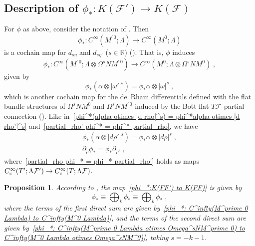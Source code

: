 \documentclass{memo-l}
\theoremstyle{plain}
\newtheorem{prop}[thm]{Proposition}
\theoremstyle{definition}
\theoremstyle{remark}
\newcommand{\R}{\mathbb{R}}
\newcommand{\FF}{\mathcal{F}}
\newcommand{\Cinftyc}{C^\infty_{\text{\rm c}}}
\numberwithin{section}{chapter}
\numberwithin{equation}{section}%
\begin{document}
\subsection{Description of $\phi_*:K(\FF')\to K(\FF)$}\label{ss: description of phi_*: K(FF') to K(FF)}

For $\phi$ as above, consider the notation of . Then
\begin{equation}\label{phi_*: C^infty(M^prime 0 Lambda) to C^infty(M^0 Lambda)}
\phi_*:C^\infty(M^{\prime\,0};\Lambda)\to C^\infty(M^0;\Lambda)
\end{equation}
is a cochain map for $d_{s\eta}$ and $d_{s\eta'}$ ($s\in\R$) (). That is, $\phi$ induces
\begin{equation}
\label{phi_*: C^infty(M^prime 0 Lambda otimes Omega^sNM^prime 0) to C^infty(M^0 Lambda otimes Omega^sNM^0)}
\phi_*:C^\infty(M^{\prime\,0};\Lambda\otimes\Omega^sNM^{\prime\,0})\to C^\infty(M^0;\Lambda\otimes\Omega^sNM^0)\;,
\end{equation} 
given by
\begin{equation}\label{phi_*(alpha otimes |omega'|^s) = phi_*alpha otimes |omega|^s}
\phi_*(\alpha\otimes|\omega'|^s)=\phi_*\alpha\otimes|\omega|^s\;,
\end{equation}
which is another cochain map for the de~Rham differentials defined with the flat bundle structures of $\Omega^sNM^0$ and $\Omega^sNM^{\prime\,0}$ induced by the Bott flat $T\FF$-partial connection (). Like in~\eqref{phi^*(alpha otimes |d rho|^s) = phi^*alpha otimes |d rho'|^s} and~\eqref{partial_rho' phi^* = phi^* partial_rho}, we have
\begin{gather}
\phi_*(\alpha\otimes|d\rho'|^s)=\phi_*\alpha\otimes|d\rho|^s\;,
\label{phi_*(alpha otimes |d rho'|^s) = phi_*alpha otimes |d rho|^s}\\
\partial_\rho\phi_*=\phi_*\partial_{\rho'}\;,
\label{partial_rho phi_* = phi_* partial_rho'}
\end{gather}
where~\eqref{partial_rho phi_* = phi_* partial_rho'} holds as maps $\Cinftyc(T';\Lambda\FF')\to\Cinftyc(T;\Lambda\FF)$.


\begin{prop}\label{p: phi_* equiv bigoplus_k phi_*}
According to , the map~\eqref{phi_*:K(FF') to K(FF)} is given by
\[
\phi_*\equiv\bigoplus_k\phi_*\equiv\bigoplus_k\phi_*\;,
\]
where the terms of the first direct sum are given by~\eqref{phi_*: C^infty(M^prime 0 Lambda) to C^infty(M^0 Lambda)}, and the terms of the second direct sum are given by~\eqref{phi_*: C^infty(M^prime 0 Lambda otimes Omega^sNM^prime 0) to C^infty(M^0 Lambda otimes Omega^sNM^0)}, taking $s=-k-1$.
\end{prop}
\end{document}
